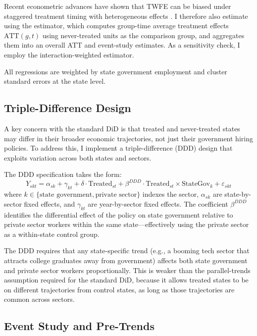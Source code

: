 \documentclass[12pt]{article}
\begin{document}
Recent econometric advances have shown that TWFE can be biased under staggered treatment timing with heterogeneous effects \citep{GoodmanBacon2021, deChaisemartinDHaultfoeuille2020}. I therefore also estimate using the \citet{CallawaySantanna2021} estimator, which computes group-time average treatment effects $\text{ATT}(g,t)$ using never-treated units as the comparison group, and aggregates them into an overall ATT and event-study estimates. As a sensitivity check, I employ the \citet{SunAbraham2021} interaction-weighted estimator.

All regressions are weighted by state government employment and cluster standard errors at the state level.

\subsection{Triple-Difference Design}

A key concern with the standard DiD is that treated and never-treated states may differ in their broader economic trajectories, not just their government hiring policies. To address this, I implement a triple-difference (DDD) design that exploits variation across both states and sectors.

The DDD specification takes the form:
\begin{equation} \label{eq:ddd}
Y_{skt} = \alpha_{sk} + \gamma_{kt} + \delta \cdot \text{Treated}_{st} + \beta^{DDD} \cdot \text{Treated}_{st} \times \text{StateGov}_{k} + \varepsilon_{skt}
\end{equation}
where $k \in \{\text{state government}, \text{private sector}\}$ indexes the sector, $\alpha_{sk}$ are state-by-sector fixed effects, and $\gamma_{kt}$ are year-by-sector fixed effects. The coefficient $\beta^{DDD}$ identifies the differential effect of the policy on state government relative to private sector workers within the same state---effectively using the private sector as a within-state control group.

The DDD requires that any state-specific trend (e.g., a booming tech sector that attracts college graduates away from government) affects both state government and private sector workers proportionally. This is weaker than the parallel-trends assumption required for the standard DiD, because it allows treated states to be on different trajectories from control states, as long as those trajectories are common across sectors.

\subsection{Event Study and Pre-Trends}
\end{document}
